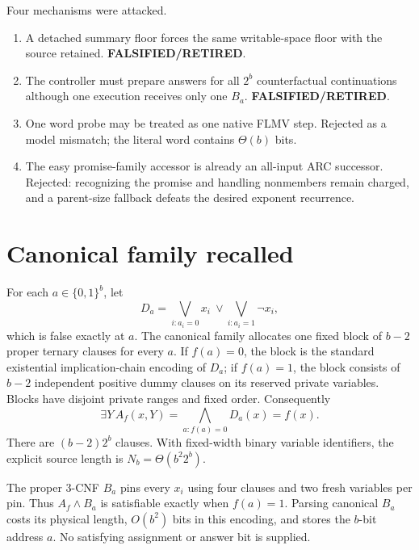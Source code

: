 \documentclass[11pt]{article}
\newcommand{\RET}{\textbf{FALSIFIED/RETIRED}}
\begin{document}
Four mechanisms were attacked.
\begin{enumerate}
\item A detached summary floor forces the same writable-space floor with the
source retained.  \RET.
\item The controller must prepare answers for all $2^b$ counterfactual
continuations although one execution receives only one $B_a$.  \RET.
\item One word probe may be treated as one native FLMV step.  Rejected as a
model mismatch; the literal word contains $\Theta(b)$ bits.
\item The easy promise-family accessor is already an all-input ARC successor.
Rejected: recognizing the promise and handling nonmembers remain charged, and
a parent-size fallback defeats the desired exponent recurrence.
\end{enumerate}

\section{Canonical family recalled}
For each $a\in\{0,1\}^b$, let
\[
 D_a=\bigvee_{i:a_i=0}x_i\ \vee
     \bigvee_{i:a_i=1}\neg x_i,
\]
which is false exactly at $a$.  The canonical family allocates one fixed block
of $b-2$ proper ternary clauses for every $a$.  If $f(a)=0$, the block is the
standard existential implication-chain encoding of $D_a$; if $f(a)=1$, the
block consists of $b-2$ independent positive dummy clauses on its reserved
private variables.  Blocks have disjoint private ranges and fixed order.
Consequently
\[
 \exists Y\,A_f(x,Y)=\bigwedge_{a:f(a)=0}D_a(x)=f(x).
\]
There are $(b-2)2^b$ clauses.  With fixed-width binary variable identifiers,
the explicit source length is $N_b=\Theta(b^2 2^b)$.

The proper 3-CNF $B_a$ pins every $x_i$ using four clauses and two fresh
variables per pin.  Thus $A_f\wedge B_a$ is satisfiable exactly when $f(a)=1$.
Parsing canonical $B_a$ costs its physical length, $O(b^2)$ bits in this
encoding, and stores the $b$-bit address $a$.  No satisfying assignment or
answer bit is supplied.
\end{document}
